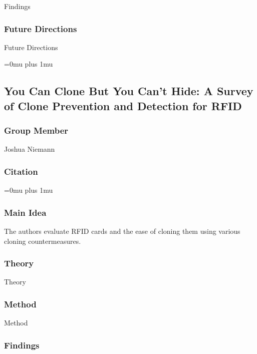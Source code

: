 \noindent
Findings

\subsubsection{Future Directions}

\noindent
Future Directions 

\Urlmuskip=0mu plus 1mu\relax

\noindent
\subsection{{Y}ou {C}an {C}lone {B}ut {Y}ou {C}an't {H}ide: {A} {S}urvey of {C}lone {P}revention and {D}etection for {RFID}}

\subsubsection{Group Member}

\noindent
Joshua Niemann

\noindent
\subsubsection{Citation}

\Urlmuskip=0mu plus 1mu\relax

\subsubsection{Main Idea}

\noindent
The authors evaluate RFID cards and the ease of cloning them using various cloning countermeasures.

\subsubsection{Theory}

\noindent
Theory

\subsubsection{Method}

\noindent
Method

\subsubsection{Findings}

